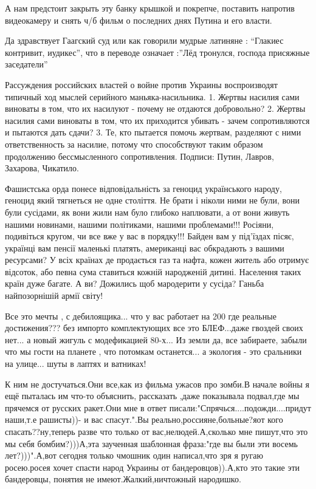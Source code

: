 А нам предстоит закрыть эту банку крышкой и покрепче, поставить напротив
видеокамеру и снять ч/б фильм о последних днях Путина и его власти.

Да здравствует Гаагский суд или как говорили мудрые латиняне : “Глакиес
контривит, иудикес”, что в переводе означает :”Лёд тронулся, господа присяжные
заседатели”

Рассуждения российских властей о войне против Украины воспроизводят типичный ход мыслей серийного маньяка-насильника.
1. Жертвы насилия сами виноваты в том, что их насилуют - почему не отдаются добровольно?
2. Жертвы насилия сами виноваты в том, что их приходится убивать - зачем сопротивляются и пытаются дать сдачи?
3. Те, кто пытается помочь жертвам, разделяют с ними ответственность за насилие, потому что способствуют таким образом продолжению бессмысленного сопротивления.
Подписи: Путин, Лавров, Захарова, Чикатило.

Фашистська орда понесе відповідальність за геноцид українського народу, геноцид
який тягнеться не одне століття. Не брати і ніколи ними не були, вони були
сусідами, як вони жили нам було глибоко наплювати, а от вони живуть нашими
новинами, нашими політиками, нашими проблемами!!! Росіяни, подивіться кругом,
чи все вже у вас в порядку!!! Байден вам у під’їздах пісяє, українці вам пенсії
маленькі платять, американці вас обкрадають з вашими ресурсами? У всіх країнах
де продається газ та нафта, кожен житель або отримує відсоток, або певна сума
ставиться кожній народженій дитині. Населення таких країн дуже багате. А ви?
Дожились щоб мародерити у сусіда? Ганьба найпозорнішій армії світу!

Все это мечты , с дебилоящика... что у вас работает на 200%
где реальные достижения??? без импорто комплектующих все это БЛЕФ...даже
гвоздей своих нет... а новый жигуль с модефикацией 80-х... Из земли да, все
забираете, забыли что мы гости на планете , что потомкам останется... а
экология - это сральники на улице... шуты в лаптях и ватниках!

К ним не достучаться.Они все,как из фильма ужасов про зомби.В начале войны я
ещё пыталась им что-то объяснить, рассказать ,даже показывала подвал,где мы
прячемся от русских ракет.Они мне в ответ писали:"Спрячься....подожди....придут
наши,т.е рашисты))- и вас спасут.".Вы реально,россияне,больные?яот кого
спасать??ну,теперь разве что только от вас,нелюдей.А,сколько мне пишут,что это
мы себя бомбим?)))А,эта заученная шаблонная фраза:"где вы были эти восемь
лет?)))".А,вот сегодня только чмошник один написал,что зря я ругаю росею.росея
хочет спасти народ Украины от бандеровцов)).А,кто это такие эти бандеровцы,
понятия не имеют.Жалкий,ничтожный народишко.

